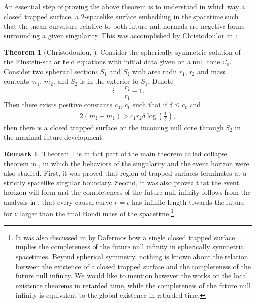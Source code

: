 \documentclass[11pt,reqno]{amsart}
\theoremstyle{definition}
\newtheorem{theorem}{Theorem}[section]
\newtheorem{remark}{Remark}[section]
\numberwithin{equation}{section}
\begin{document}
An essential step of proving the above theorem is to understand in which way a closed trapped surface, a 2-spacelike surface embedding in the spacetime such that the mean curvature relative to both future null normals are negetive forms surrounding a given singularity.  %
This was accomplished by Christodoulou in \cite{Chr91}:
\begin{theorem}[Christodoulou, \cite{Chr91}]\label{Chr91}
Consider the spherically symmetric solution of the Einstein-scalar field equations with initial data given on a null cone $C_o$. Consider two spherical sections $S_1$ and $S_2$ with area radii $r_1$, $r_2$ and mass contents $m_1$, $m_2$, and $S_2$ is in the exterior to $S_1$. Denote
$$\delta=\frac{r_2}{r_1}-1.$$
Then there exists positive constants $c_0$, $c_1$ such that if $\delta\le c_0$ and
\begin{align}\label{Christodouloum2-m1}2(m_2-m_1)>c_1r_2\delta\log\left(\frac{1}{\delta}\right),\end{align}
then there is a closed trapped surface on the incoming null cone through $S_2$ in the maximal future development.
\end{theorem}
\begin{remark}\label{Chr91more}Theorem \ref{Chr91} is in fact part of the main theorem called collapse theorem in \cite{Chr91}, in which the behaviors of the singularity and the event horizon were also studied. First, it was proved that region of trapped surfaces terminates at a strictly spacelike singular boundary. Second, it was also proved that the event horizon will form and the completeness of the future null infinity follows from the analysis in \cite{Chr87}, that every causal curve $r=c$ has infinite length towards the future for $c$ larger than the final Bondi mass of the spacetime.\footnote{It was also discussed in \cite{Da05} by Dafermos how a single closed trapped surface implies the completeness of the future null infinity in spherically symmetric spacetimes. Beyond spherical symmetry, nothing is known about the relation between the existence of a closed trapped surface and the completeness of the future null infinity. We would like to mention however the works \cite{L-Z1, L-Z2} on the local existence theorems in retarded time, while the completeness of the future null infinity is equivalent to the global existence in retarded time.
}
\end{remark}
\end{document}
